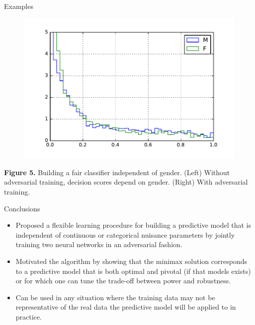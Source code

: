 \documentclass[final,unknownkeysallowed]{beamer}
\newcommand{\cmark}{\ding{51}}%
\begin{document}
\begin{frame}{}
\begin{textblock}{0.32}
\begin{block}{Examples \phantom{p}}
\begin{figure}
\begin{minipage}{.42\linewidth}
\begin{center}
    \end{center}
\end{minipage}
\hspace{.05\linewidth}
\begin{minipage}{.42\linewidth}
    \begin{center}
        \includegraphics[width=\textwidth]{figures/gender-with.pdf}
    \end{center}
\end{minipage}
\end{figure}
{\bf Figure 5.} Building a fair classifier independent of gender. (Left) Without adversarial training, decision scores depend on gender. (Right) With adversarial training.

\end{block}

\vspace{0.5cm}
\begin{block}{Conclusions \phantom{p}}

\begin{itemize}
\item[{\color{green} \cmark}] Proposed a flexible learning procedure {\color{red}for building a
predictive model that is independent of continuous or categorical nuisance
parameters} by jointly training two neural networks in an adversarial fashion.

\item[{\color{green} \cmark}] Motivated the algorithm by showing
that the minimax solution corresponds to a predictive model
that is both optimal and pivotal (if that models exists) or for which one can
tune the trade-off between power and robustness.

\item[{\color{green} \cmark}] Can be used in any situation
where the training data may not be representative of the real data the
predictive model will be applied to in practice.


\end{itemize}
\end{block}
\end{textblock}
\end{frame}
\end{document}

